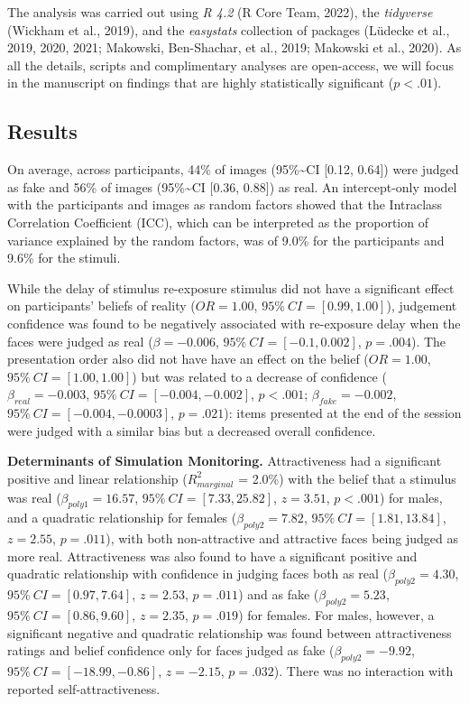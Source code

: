 \documentclass[
  man,
  floatsintext,
  longtable,
  nolmodern,
  notxfonts,
  notimes,
  colorlinks=true,linkcolor=blue,citecolor=blue,urlcolor=blue]{apa7}
\begin{document}
The analysis was carried out using \emph{R 4.2} (R Core Team, 2022), the
\emph{tidyverse} (Wickham et al., 2019), and the \emph{easystats}
collection of packages (Lüdecke et al., 2019, 2020, 2021; Makowski,
Ben-Shachar, et al., 2019; Makowski et al., 2020). As all the details,
scripts and complimentary analyses are open-access, we will focus in the
manuscript on findings that are highly statistically significant
(\(p <.01\)).

\subsection{Results}\label{results}

On average, across participants, 44\% of images (95\%\textasciitilde CI
{[}0.12, 0.64{]}) were judged as fake and 56\% of images
(95\%\textasciitilde CI {[}0.36, 0.88{]}) as real. An intercept-only
model with the participants and images as random factors showed that the
Intraclass Correlation Coefficient (ICC), which can be interpreted as
the proportion of variance explained by the random factors, was of 9.0\%
for the participants and 9.6\% for the stimuli.

While the delay of stimulus re-exposure stimulus did not have a
significant effect on participants' beliefs of reality (\(OR = 1.00\),
\(95\%~CI = [0.99, 1.00]\)), judgement confidence was found to be
negatively associated with re-exposure delay when the faces were judged
as real (\(\beta = -0.006\), \(95\%~CI = [-0.1, 0.002]\), \(p = .004\)).
The presentation order also did not have have an effect on the belief
(\(OR = 1.00\), \(95\%~CI = [1.00, 1.00]\)) but was related to a
decrease of confidence (\(\beta_{real} = -0.003\),
\(95\%~CI = [-0.004, -0.002]\), \(p < .001\); \(\beta_{fake} = -0.002\),
\(95\%~CI = [-0.004, -0.0003]\), \(p = .021\)): items presented at the
end of the session were judged with a similar bias but a decreased
overall confidence.

\textbf{Determinants of Simulation Monitoring.} Attractiveness had a
significant positive and linear relationship (\(R^2_{marginal}\) =
2.0\%) with the belief that a stimulus was real
(\(\beta_{poly1} = 16.57\), \(95\%~CI = [7.33, 25.82]\), \(z = 3.51\),
\(p < .001\)) for males, and a quadratic relationship for females
(\(\beta_{poly2} = 7.82\), \(95\%~CI = [1.81, 13.84]\), \(z = 2.55\),
\(p = .011\)), with both non-attractive and attractive faces being
judged as more real. Attractiveness was also found to have a significant
positive and quadratic relationship with confidence in judging faces
both as real (\(\beta_{poly2} = 4.30\), \(95\%~CI = [0.97, 7.64]\),
\(z = 2.53\), \(p = .011\)) and as fake (\(\beta_{poly2} = 5.23\),
\(95\%~CI = [0. 86, 9.60]\), \(z = 2.35\), \(p = .019\)) for females.
For males, however, a significant negative and quadratic relationship
was found between attractiveness ratings and belief confidence only for
faces judged as fake (\(\beta_{poly2} = -9.92\),
\(95\%~CI = [-18.99, -0.86]\), \(z = -2.15\), \(p = .032\)). There was
no interaction with reported self-attractiveness.
\end{document}
